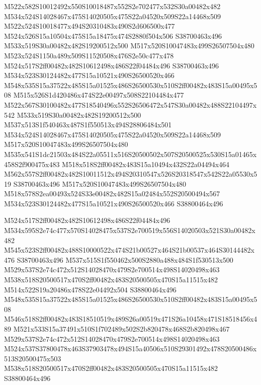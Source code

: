 \documentclass{article}
\begin{document}
\begin{multicols}{2}
M522x582S10012492x550S10018487x552S2e702477x532S30a00482x482 M534x524S14028467x475S14020505x475S22a04520x509S22a14468x509 M522x524S10018477x494S20310483x490S2d606500x477 M524x526S15a10504x475S15a18475x474S2880f504x506 S38700463x496 M533x519S30a00482x482S19200512x500 M517x520S10047483x499S26507504x480 M523x524S1150a489x509S11520508x476S2e50c477x478 M524x517S2ff00482x482S10612498x486S22f04484x496 S38700463x496 M534x523S30124482x477S15a10521x490S26500520x466 M548x535S15a37522x485S15a01525x486S26500530x510S2ff00482x483S15a00495x508 M515x526S1d420486x474S22e00497x508S22104484x477 M522x567S30100482x477S18540496x552S26506472x547S30a00482x488S22104497x542 M533x519S30a00482x482S19200512x500 M537x513S1f540463x487S1f550513x494S28806484x501 M534x524S14028467x475S14020505x475S22a04520x509S22a14468x509 M517x520S10047483x499S26507504x480 M535x541S1dc21503x484S22a05511x516S20500502x507S20500525x530S15a01465x458S2f900475x483 M518x518S2ff00482x483S15a10494x432S22a04494x464 M562x557S2ff00482x482S10011512x494S20310547x526S20318547x542S22a05530x519 S38700463x496 M517x520S10047483x499S26507504x480 M518x578S2ea00493x524S33e00482x482S15a02484x552S20500494x567 M534x523S30124482x477S15a10521x490S26500520x466 S38800464x496

M524x517S2ff00482x482S10612498x486S22f04484x496 M534x595S2e74c477x570S14028475x537S2e700519x556S14020503x521S30a00482x482 M545x523S2ff00482x488S10000522x474S21b00527x464S21b00537x464S30144482x476 S38700463x496 M537x515S1f550462x500S2880a488x484S1f530513x500 M529x537S2e74c472x512S14028470x479S2e700514x498S14020498x463 M538x518S20500517x470S2ff00482x483S20500505x470S15a11515x482 M514x522S19a20486x478S22e04492x504 S38800464x496 M548x535S15a37522x485S15a01525x486S26500530x510S2ff00482x483S15a00495x508 M546x518S2ff00482x483S18510519x489S26a00519x471S26a10458x471S18518456x489 M521x533S15a37491x510S1f702489x502S2b820478x468S2b820498x467 M529x537S2e74c472x512S14028470x479S2e700514x498S14020498x463 M524x537S37800478x463S37903478x494S15a40506x510S29301492x478S20500486x513S20500475x503 M538x518S20500517x470S2ff00482x483S20500505x470S15a11515x482 S38800464x496


\end{multicols}
\end{document}
